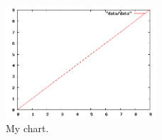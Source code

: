 \documentclass[a4paper,12pt]{article}
\begin{document}
 
\begin{figure}[h!]
  \caption{My chart.}
  \centering
    \includegraphics[width=0.5\textwidth]{pic/plot}
\end{figure}

\begin{center}
  
\end{center}
\end{document}
